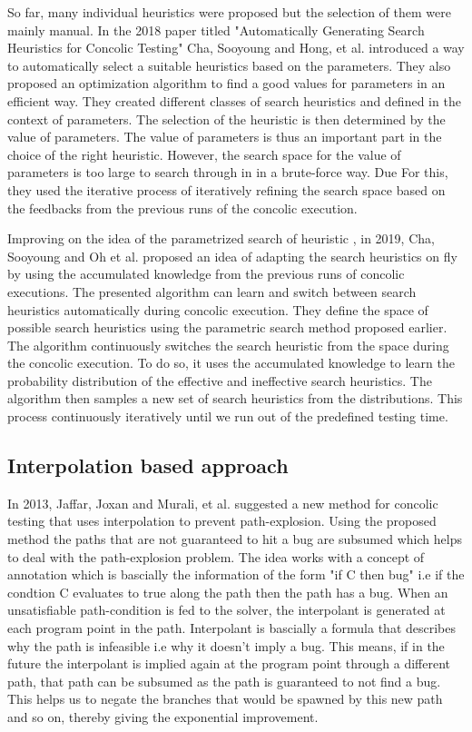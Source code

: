 \documentclass[	runningheads,
				a4paper]{llncs}
\begin{document}
So far, many individual heuristics were proposed but the selection of them were mainly manual. In the 2018 paper titled "Automatically Generating Search Heuristics for Concolic Testing" \cite{cha2018automatically} Cha, Sooyoung and Hong, et al. introduced a way to automatically select a suitable heuristics based on the parameters. They also proposed an optimization algorithm to find a good values for parameters in an efficient way. They created different classes of search heuristics and defined in the context of parameters. The selection of the heuristic is then determined by the value of parameters. The value of parameters is thus an important part in the choice of the right heuristic. However, the search space for the value of parameters is too large to search through in in a brute-force way. Due For this, they used the iterative process of iteratively refining the search space based on the feedbacks from the previous runs of the concolic execution. 

Improving on the idea of the parametrized search of heuristic \cite{cha2018automatically}, in 2019, Cha, Sooyoung and Oh et al. proposed an idea \cite{adapt2019heuristic} of adapting the search heuristics on fly by using the accumulated knowledge from the previous runs of concolic executions. The presented algorithm can learn and switch between search heuristics automatically during concolic execution. They define the space of possible search heuristics using the parametric search method \cite{adapt2019heuristic} proposed earlier. The algorithm continuously switches the search heuristic from the space during the concolic execution. To do so, it uses the accumulated knowledge to learn the probability distribution of the effective and ineffective search heuristics. The algorithm then samples a new set of search heuristics from the distributions. This process continuously iteratively until we run out of the predefined testing time.


\subsection{Interpolation based approach}
In 2013, Jaffar, Joxan and Murali, et al. suggested a new method \cite{jaffar2013boosting} for concolic testing that uses interpolation to prevent path-explosion. Using the proposed method the paths that are not guaranteed to hit a bug are subsumed which helps to deal with the path-explosion problem. The idea works with a concept of annotation which is bascially the  information of the form "if C then bug" i.e if the condtion C evaluates to true along the path then the path has a bug. When an unsatisfiable path-condition is fed to the solver, the interpolant is generated at each program point in the path. Interpolant is bascially a formula that describes why the path is infeasible i.e why it doesn't imply a bug. This means, if in the future the interpolant is implied again at the program point through a different path, that path can be subsumed as the path is guaranteed to not find a bug. This helps us to negate the branches that would be spawned by this new path and so on, thereby giving the exponential improvement.
\end{document}
